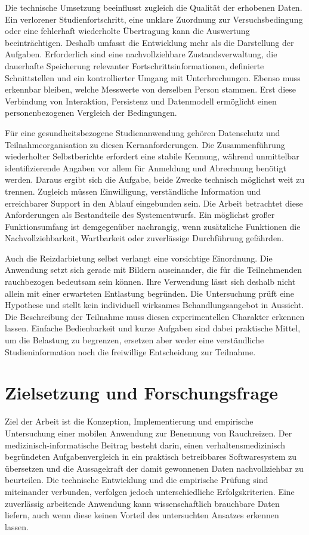 Die technische Umsetzung beeinflusst zugleich die Qualität der erhobenen Daten. Ein verlorener Studienfortschritt, eine unklare Zuordnung zur Versuchsbedingung oder eine fehlerhaft wiederholte Übertragung kann die Auswertung beeinträchtigen. Deshalb umfasst die Entwicklung mehr als die Darstellung der Aufgaben. Erforderlich sind eine nachvollziehbare Zustandsverwaltung, die dauerhafte Speicherung relevanter Fortschrittsinformationen, definierte Schnittstellen und ein kontrollierter Umgang mit Unterbrechungen. Ebenso muss erkennbar bleiben, welche Messwerte von derselben Person stammen. Erst diese Verbindung von Interaktion, Persistenz und Datenmodell ermöglicht einen personenbezogenen Vergleich der Bedingungen.

Für eine gesundheitsbezogene Studienanwendung gehören Datenschutz und Teilnahmeorganisation zu diesen Kernanforderungen. Die Zusammenführung wiederholter Selbstberichte erfordert eine stabile Kennung, während unmittelbar identifizierende Angaben vor allem für Anmeldung und Abrechnung benötigt werden. Daraus ergibt sich die Aufgabe, beide Zwecke technisch möglichst weit zu trennen. Zugleich müssen Einwilligung, verständliche Information und erreichbarer Support in den Ablauf eingebunden sein. Die Arbeit betrachtet diese Anforderungen als Bestandteile des Systementwurfs. Ein möglichst großer Funktionsumfang ist demgegenüber nachrangig, wenn zusätzliche Funktionen die Nachvollziehbarkeit, Wartbarkeit oder zuverlässige Durchführung gefährden.

Auch die Reizdarbietung selbst verlangt eine vorsichtige Einordnung. Die Anwendung setzt sich gerade mit Bildern auseinander, die für die Teilnehmenden rauchbezogen bedeutsam sein können. Ihre Verwendung lässt sich deshalb nicht allein mit einer erwarteten Entlastung begründen. Die Untersuchung prüft eine Hypothese und stellt kein individuell wirksames Behandlungsangebot in Aussicht. Die Beschreibung der Teilnahme muss diesen experimentellen Charakter erkennen lassen. Einfache Bedienbarkeit und kurze Aufgaben sind dabei praktische Mittel, um die Belastung zu begrenzen, ersetzen aber weder eine verständliche Studieninformation noch die freiwillige Entscheidung zur Teilnahme.

\section*{Zielsetzung und Forschungsfrage}

Ziel der Arbeit ist die Konzeption, Implementierung und empirische Untersuchung einer mobilen Anwendung zur Benennung von Rauchreizen. Der medizinisch-informatische Beitrag besteht darin, einen verhaltensmedizinisch begründeten Aufgabenvergleich in ein praktisch betreibbares Softwaresystem zu übersetzen und die Aussagekraft der damit gewonnenen Daten nachvollziehbar zu beurteilen. Die technische Entwicklung und die empirische Prüfung sind miteinander verbunden, verfolgen jedoch unterschiedliche Erfolgskriterien. Eine zuverlässig arbeitende Anwendung kann wissenschaftlich brauchbare Daten liefern, auch wenn diese keinen Vorteil des untersuchten Ansatzes erkennen lassen.

